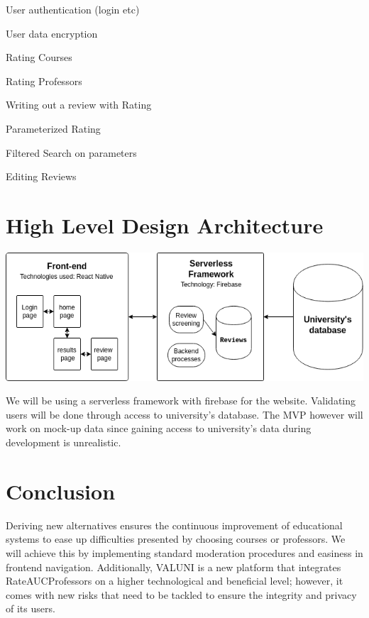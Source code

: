 \documentclass{article}
\begin{document}
	\quad User authentication (login etc)

	\quad User data encryption

	\quad Rating Courses

	\quad Rating Professors

	\quad Writing out a review with Rating

	\quad Parameterized Rating

	\quad Filtered Search on parameters	

	\quad Editing Reviews


\section{High Level Design Architecture}

\begin{center} 
	\includegraphics[scale=0.5]{./projectUml.drawio.png}
\end{center}

\quad We will be using a serverless framework with firebase for the website. Validating users will be done through access to university's database. The MVP however will work on mock-up data since gaining access to university's data during development is unrealistic.

\section{Conclusion}

\quad Deriving new alternatives ensures the continuous improvement of educational systems to ease up difficulties presented by choosing courses or professors. We will achieve this by implementing standard moderation procedures and easiness in frontend navigation. Additionally,  VALUNI is a new platform that integrates RateAUCProfessors on a higher technological and beneficial level; however, it comes with new risks that need to be tackled to ensure the integrity and privacy of its users. 
\end{document}
